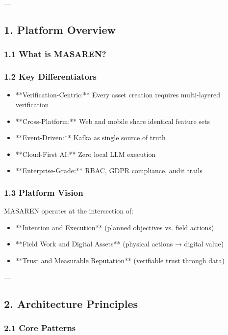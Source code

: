 \documentclass[11pt,a4paper]{article}
\begin{document}
---

\subsection{1. Platform Overview}

\subsubsection{1.1 What is MASAREN?}



\subsubsection{1.2 Key Differentiators}

\begin{itemize}
\item **Verification-Centric:** Every asset creation requires multi-layered verification
\item **Cross-Platform:** Web and mobile share identical feature sets
\item **Event-Driven:** Kafka as single source of truth
\item **Cloud-First AI:** Zero local LLM execution
\item **Enterprise-Grade:** RBAC, GDPR compliance, audit trails
\end{itemize}

\subsubsection{1.3 Platform Vision}

MASAREN operates at the intersection of:
\begin{itemize}
\item **Intention and Execution** (planned objectives vs. field actions)
\item **Field Work and Digital Assets** (physical actions → digital value)
\item **Trust and Measurable Reputation** (verifiable trust through data)
\end{itemize}

---

\subsection{2. Architecture Principles}

\subsubsection{2.1 Core Patterns}
\end{document}
